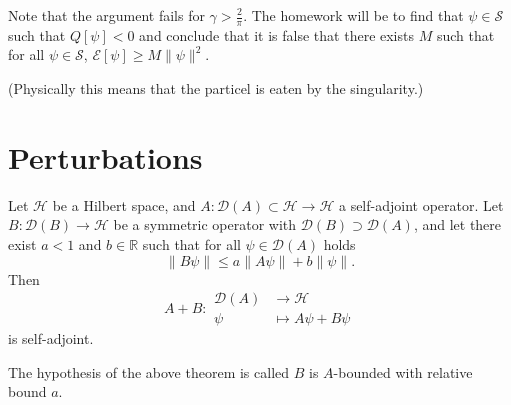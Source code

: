 \documentclass[12pt]{article}
\numberwithin{equation}{section}
\theoremstyle{plain}
\theoremstyle{plain}
\begin{document}
\begin{example*}
	Note that the argument fails for $\gamma > \frac{2}{\pi}$. The homework will be to find that $\psi \in \mathscr S$ such that $Q[\psi] < 0$ and conclude that it is false that there exists $M$ such that for all $\psi \in \mathscr S$, $\mathcal E[\psi]\geqslant M \|\psi\|^2$.
	
	(Physically this means that the particel is eaten by the singularity.)
\end{example*}


\section{Perturbations}

\begin{theorem}
	Let $\mathcal H$ be a Hilbert space, and $A: \mathcal D(A) \subset \mathcal H \rightarrow \mathcal H$ a self-adjoint operator. Let $B : \mathcal D(B) \rightarrow \mathcal{H}$ be a symmetric operator with $\mathcal D(B) \supset \mathcal D(A)$, and let there exist $a<1$ and $b \in \mathbb{R}$ such that for all $\psi \in \mathcal D(A)$ holds
	\[
		\|B\psi\| \leqslant a \|A\psi\| + b \|\psi\|.	
	\]
	Then 
	\[
		A+B:	
		\begin{aligned}
			\mathcal D(A) & \longrightarrow \mathcal H\\
			\psi & \longmapsto A\psi + B\psi
		\end{aligned}	
	\]
	is self-adjoint.
\end{theorem}
\begin{remark*}
	The hypothesis of the above theorem is called $B$ is $A$-bounded with relative bound $a$.
\end{remark*}
\end{document}
